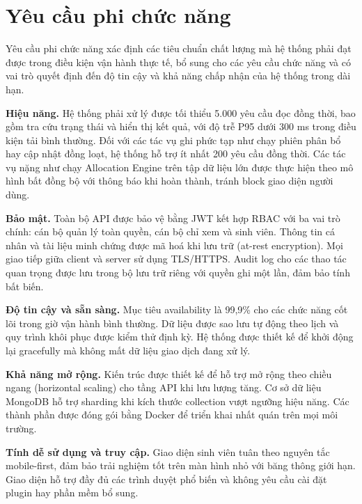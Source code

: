 ﻿\documentclass[a4paper,12pt,openany,oneside]{report}
\begin{document}
\section{Yêu cầu phi chức năng}
\label{sec:nonfunctional}

Yêu cầu phi chức năng xác định các tiêu chuẩn chất lượng mà hệ thống phải đạt
được trong điều kiện vận hành thực tế, bổ sung cho các yêu cầu chức năng và có
vai trò quyết định đến độ tin cậy và khả năng chấp nhận của hệ thống trong dài
hạn.

\textbf{Hiệu năng.} Hệ thống phải xử lý được tối thiểu 5.000 yêu cầu đọc đồng
thời, bao gồm tra cứu trạng thái và hiển thị kết quả, với độ trễ P95 dưới 300 ms
trong điều kiện tải bình thường. Đối với các tác vụ ghi phức tạp như chạy phiên
phân bổ hay cập nhật đồng loạt, hệ thống hỗ trợ ít nhất 200 yêu cầu đồng thời.
Các tác vụ nặng như chạy Allocation Engine trên tập dữ liệu lớn được thực hiện
theo mô hình bất đồng bộ với thông báo khi hoàn thành, tránh block giao diện
người dùng.

\textbf{Bảo mật.} Toàn bộ API được bảo vệ bằng JWT kết hợp RBAC với ba vai trò
chính: cán bộ quản lý toàn quyền, cán bộ chỉ xem và sinh viên. Thông tin cá
nhân và tài liệu minh chứng được mã hoá khi lưu trữ (at-rest encryption). Mọi
giao tiếp giữa client và server sử dụng TLS/HTTPS. Audit log cho các thao tác
quan trọng được lưu trong bộ lưu trữ riêng với quyền ghi một lần, đảm bảo tính
bất biến.

\textbf{Độ tin cậy và sẵn sàng.} Mục tiêu availability là 99,9\% cho các chức
năng cốt lõi trong giờ vận hành bình thường. Dữ liệu được sao lưu tự động theo
lịch và quy trình khôi phục được kiểm thử định kỳ. Hệ thống được thiết kế để
khởi động lại gracefully mà không mất dữ liệu giao dịch đang xử lý.

\textbf{Khả năng mở rộng.} Kiến trúc được thiết kế để hỗ trợ mở rộng theo chiều
ngang (horizontal scaling) cho tầng API khi lưu lượng tăng. Cơ sở dữ liệu
MongoDB hỗ trợ sharding khi kích thước collection vượt ngưỡng hiệu năng. Các
thành phần được đóng gói bằng Docker để triển khai nhất quán trên mọi môi trường.

\textbf{Tính dễ sử dụng và truy cập.} Giao diện sinh viên tuân theo nguyên tắc
mobile-first, đảm bảo trải nghiệm tốt trên màn hình nhỏ với băng thông giới hạn.
Giao diện hỗ trợ đầy đủ các trình duyệt phổ biến và không yêu cầu cài đặt plugin
hay phần mềm bổ sung.
\end{document}

